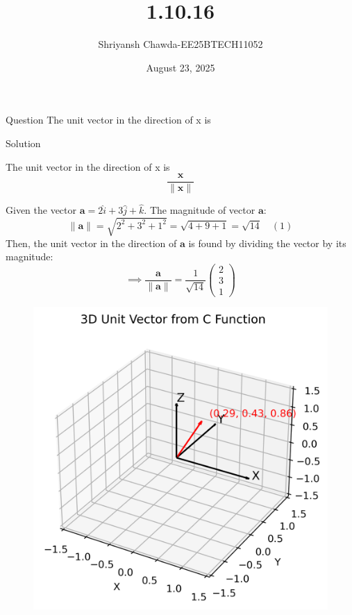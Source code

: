 \documentclass{beamer}
\title{1.10.16}
\author{Shriyansh Chawda-EE25BTECH11052}
\date{August 23, 2025}
\begin{document}
	

		\frame{\titlepage}
	
	
	

	\begin{frame}{Question} 
			The unit vector in the direction of x is
	\end{frame}
	
	

	\begin{frame}{Solution}

The unit vector in the direction of x is
\begin{equation}
	\frac{\mathbf{x}}{\|\mathbf{x}\|} \tag{1.1.8.1}
\end{equation}

Given the vector $\mathbf{a} = 2\hat{i} + 3 \hat{j} + \hat{k}$.
The magnitude of vector $\mathbf{a}$:$$ \|\mathbf{a}\| = \sqrt{2^2 + 3^2 + 1^2} = \sqrt{4+9+1} = \sqrt{14} \quad (1)$$Then, the unit vector in the direction of $\mathbf{a}$ is found by dividing the vector by its magnitude:$$\implies \frac{\mathbf{a}}{\|\mathbf{a}\|} = \frac{1}{\sqrt{14}} \begin{pmatrix} 
	2 \\ 
	3 \\ 
	1 
\end{pmatrix} 
$$
\end{frame}
\begin{frame}
\begin{figure}[h!]
	\centering
	\includegraphics[width=0.5\linewidth]{figs/unit_vector3d}
	\label{fig:unitvector3d}
\end{figure}


\end{frame}
\end{document}
